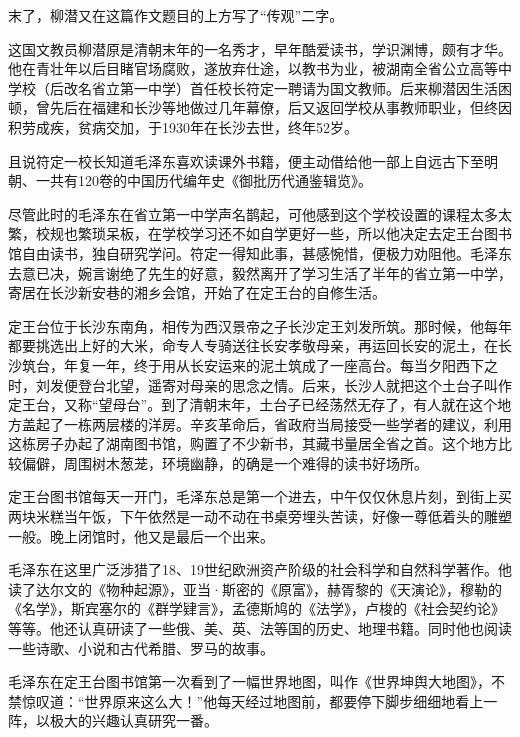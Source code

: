 \documentclass[../../dazhuan.tex]{subfiles}
\begin{document}
末了，柳潜又在这篇作文题目的上方写了“传观”二字。

这国文教员柳潜原是清朝末年的一名秀才，早年酷爱读书，学识渊博，颇有才华。他在青壮年以后目睹官场腐败，遂放弃仕途，以教书为业，被湖南全省公立高等中学校（后改名省立第一中学）首任校长符定一聘请为国文教师。后来柳潜因生活困顿，曾先后在福建和长沙等地做过几年幕僚，后又返回学校从事教师职业，但终因积劳成疾，贫病交加，于1930年在长沙去世，终年52岁。

且说符定一校长知道毛泽东喜欢读课外书籍，便主动借给他一部上自远古下至明朝、一共有120卷的中国历代编年史《御批历代通鉴辑览》。

尽管此时的毛泽东在省立第一中学声名鹊起，可他感到这个学校设置的课程太多太繁，校规也繁琐呆板，在学校学习还不如自学更好一些，所以他决定去定王台图书馆自由读书，独自研究学问。符定一得知此事，甚感惋惜，便极力劝阻他。毛泽东去意已决，婉言谢绝了先生的好意，毅然离开了学习生活了半年的省立第一中学，寄居在长沙新安巷的湘乡会馆，开始了在定王台的自修生活。

定王台位于长沙东南角，相传为西汉景帝之子长沙定王刘发所筑。那时候，他每年都要挑选出上好的大米，命专人专骑送往长安孝敬母亲，再运回长安的泥土，在长沙筑台，年复一年，终于用从长安运来的泥土筑成了一座高台。每当夕阳西下之时，刘发便登台北望，遥寄对母亲的思念之情。后来，长沙人就把这个土台子叫作定王台，又称“望母台”。到了清朝末年，土台子已经荡然无存了，有人就在这个地方盖起了一栋两层楼的洋房。辛亥革命后，省政府当局接受一些学者的建议，利用这栋房子办起了湖南图书馆，购置了不少新书，其藏书量居全省之首。这个地方比较偏僻，周围树木葱茏，环境幽静，的确是一个难得的读书好场所。

定王台图书馆每天一开门，毛泽东总是第一个进去，中午仅仅休息片刻，到街上买两块米糕当午饭，下午依然是一动不动在书桌旁埋头苦读，好像一尊低着头的雕塑一般。晚上闭馆时，他又是最后一个出来。

毛泽东在这里广泛涉猎了18、19世纪欧洲资产阶级的社会科学和自然科学著作。他读了达尔文的《物种起源》，亚当·斯密的《原富》，赫胥黎的《天演论》，穆勒的《名学》，斯宾塞尔的《群学肄言》，孟德斯鸠的《法学》，卢梭的《社会契约论》等等。他还认真研读了一些俄、美、英、法等国的历史、地理书籍。同时他也阅读一些诗歌、小说和古代希腊、罗马的故事。

毛泽东在定王台图书馆第一次看到了一幅世界地图，叫作《世界坤舆大地图》，不禁惊叹道：“世界原来这么大！”他每天经过地图前，都要停下脚步细细地看上一阵，以极大的兴趣认真研究一番。
\end{document}
